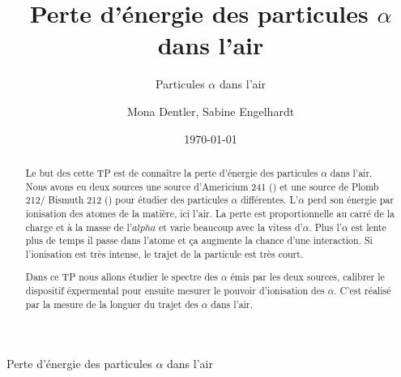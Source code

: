\documentclass[a4paper,11pt]{scrartcl}
\title{Perte d'énergie des particules $\alpha$ dans l'air}
\subtitle{Particules $\alpha$ dans l'air}
\author{Mona Dentler, Sabine Engelhardt}
\date{\today}
\begin{document}
 \pagestyle{empty}
 \begin{center}
  \makeatletter
  \@subject
  \vspace{2cm}

  \Huge
  Perte d'énergie des particules $\alpha$ dans l'air\newline
  \vspace{1cm}
  \Large


  \@author
  \newline
  \@publishers


  \@date
  \makeatother
 \end{center}
 \vfill

 \begin{abstract}
  Le but des cette TP est de connaître la perte d'énergie des particules $\alpha$ dans l'air. Nous avons eu deux sources une source d'Americium 241 () et une source de Plomb 212/ Bismuth 212 () pour étudier des particules $\alpha$ différentes. L'$\alpha$ perd son énergie par ionisation des atomes de la matière, ici l'air. La perte est proportionnelle au carré de la charge et à la masse de l'$alpha$ et varie beaucoup avec la vitess d'$\alpha$. Plus l'$\alpha$ est lente plus de temps il passe dans l'atome et \c ca augmente la chance d'une interaction. Si l'ionisation est très intense, le trajet de la particule est très court.

  Dans ce TP nous allons étudier le spectre des $\alpha$ émis par les deux sources, calibrer le dispositif éxpermental pour ensuite mesurer le pouvoir d'ionisation des $\alpha$. C'est réalisé par la mesure de la longuer du trajet des $\alpha$ dans l'air.
 \end{abstract}
\newpage
 \pagestyle{scrheadings}
 \tableofcontents
\newpage
\end{document}
